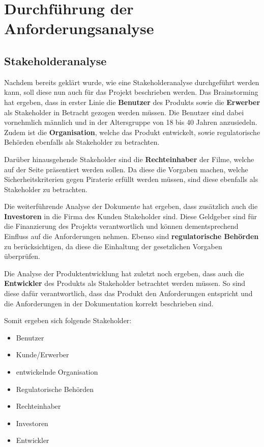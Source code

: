 \section{Durchführung der Anforderungsanalyse}
\subsection{Stakeholderanalyse}
Nachdem bereits geklärt wurde, wie eine Stakeholderanalyse durchgeführt werden kann, soll diese nun auch für das Projekt beschrieben werden.
Das Brainstorming hat ergeben, dass in erster Linie die \textbf{Benutzer} des Produkts sowie die \textbf{Erwerber} als Stakeholder in Betracht gezogen werden müssen.
Die Benutzer sind dabei vornehmlich männlich\autocite[vgl.]{Ailon.a} und in der Altersgruppe von 18 bis 40 Jahren anzusiedeln\autocite[vgl.]{Ailon.b}.
Zudem ist die \textbf{Organisation}, welche das Produkt entwickelt, sowie regulatorische Behörden ebenfalls als Stakeholder zu betrachten.

Darüber hinausgehende Stakeholder sind die \textbf{Rechteinhaber} der Filme, welche auf der Seite präsentiert werden sollen.
Da diese die Vorgaben machen, welche Sicherheitskriterien gegen Piraterie erfüllt werden müssen, sind diese ebenfalls als Stakeholder zu betrachten.

Die weiterführende Analyse der Dokumente hat ergeben, dass zusätzlich auch die \textbf{Investoren} in die Firma des Kunden Stakeholder sind.
Diese Geldgeber sind für die Finanzierung des Projekts verantwortlich und können dementsprechend Einfluss auf die Anforderungen nehmen.
Ebenso sind \textbf{regulatorische Behörden} zu berücksichtigen, da diese die Einhaltung der gesetzlichen Vorgaben überprüfen.

Die Analyse der Produktentwicklung hat zuletzt noch ergeben, dass auch die \textbf{Entwickler} des Produkts als Stakeholder betrachtet werden müssen.
So sind diese dafür verantwortlich, dass das Produkt den Anforderungen entspricht und die Anforderungen in der Dokumentation korrekt beschrieben sind.

Somit ergeben sich folgende Stakeholder:
\begin{itemize}
    \item Benutzer
    \item Kunde/Erwerber
    \item entwickelnde Organisation
    \item Regulatorische Behörden
    \item Rechteinhaber
    \item Investoren
    \item Entwickler
\end{itemize}

